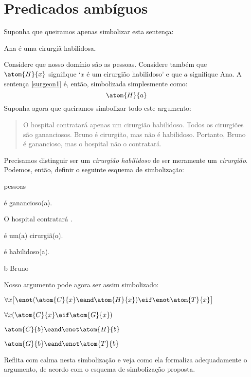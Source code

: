 \section{Predicados ambíguos}

Suponha que queiramos apenas simbolizar esta sentença:
\begin{earg}
\item[\ex{surgeon1}] Ana é uma cirurgiã habilidosa.
\end{earg}
Considere que nosso domínio são as pessoas.
Considere também que $\atom{H}{x}$ signifique `$x$ é um cirurgião habilidoso' e que $a$ signifique Ana.
A sentença \ref{surgeon1} é, então, simbolizada simplesmente como:
$$\atom{H}{a}$$
Suponha agora que queiramos simbolizar todo este argumento:
\begin{quote}
O hospital contratará apenas um cirurgião habilidoso.
Todos os cirurgiões são gananciosos.
Bruno é cirurgião, mas não é habilidoso.
Portanto, Bruno é ganancioso, mas o hospital não o contratará.
\end{quote}
Precisamos distinguir ser um \emph{cirurgião habilidoso} de ser meramente um \emph{cirurgião}.
Podemos, então, definir o seguinte esquema de simbolização:
\begin{center}
\begin{ekey}
\item[\text{domínio}] pessoas
\item[\atom{G}{x}]  é ganancioso(a).
\item[\atom{T}{x}] O hospital contratará .
\item[\atom{C}{x}]  é um(a) cirurgiã(o).
\item[\atom{H}{x}]  é habilidoso(a).
\item[b] Bruno
\end{ekey}
\end{center}

Nosso argumento pode agora ser assim simbolizado:
\begin{earg}
\label{surgeon2}
\item[] $\forall x\bigl[\enot (\atom{C}{x} \eand \atom{H}{x}) \eif \enot \atom{T}{x}\bigr]$
\item[] $\forall x(\atom{C}{x} \eif \atom{G}{x})$
\item[] $\atom{C}{b} \eand \enot \atom{H}{b}$
\item[\therefore] $\atom{G}{b} \eand \enot \atom{T}{b}$
\end{earg}
Reflita com calma nesta simbolização e veja como ela formaliza adequadamente o argumento, de acordo com o esquema de simbolização proposta.

